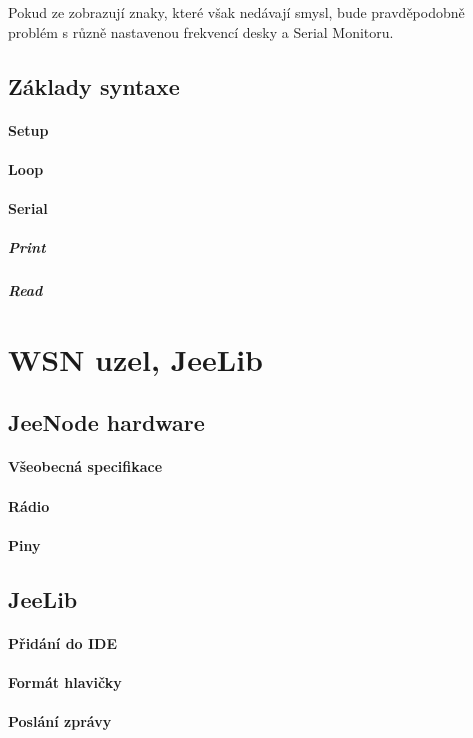 \documentclass[12pt,titlepage]{article}
\begin{document}
			Pokud ze zobrazují znaky, které však nedávají smysl, bude pravděpodobně problém s různě nastavenou frekvencí desky a Serial Monitoru. 
		
		
	\subsection{Základy syntaxe}
		\paragraph{Setup}
		\paragraph{Loop}
		\paragraph{Serial}
			\subparagraph{Print}
			\subparagraph{Read}
		
\section{WSN uzel, JeeLib}
  
	\subsection{JeeNode hardware}
		\paragraph{Všeobecná specifikace}
		\paragraph{Rádio}
		\paragraph{Piny}
	
	\subsection{JeeLib}
		\paragraph{Přidání do IDE}
		\paragraph{Formát hlavičky}
		\paragraph{Poslání zprávy}
\end{document}

